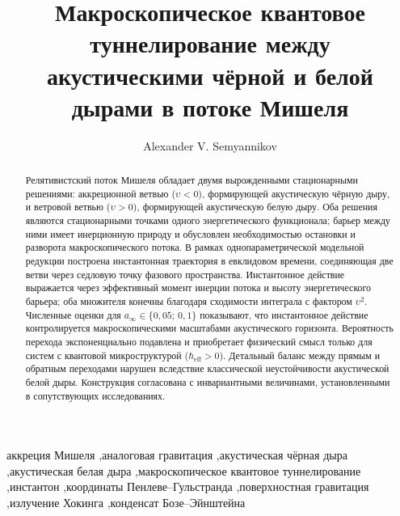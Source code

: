 \documentclass[12pt,a4paper,preprint]{elsarticle}
\begin{document}
    \begin{frontmatter}
        \title{Макроскопическое квантовое туннелирование между\\акустическими чёрной и белой дырами в потоке Мишеля}
        \author{Alexander V. Semyannikov}
        \address{Independent Researcher \\ \textit{Email: avsemyannikov@gmail.com}}
        
        \begin{abstract}
            Релятивистский поток Мишеля обладает двумя вырожденными стационарными решениями: аккреционной ветвью ($\upsilon < 0$), формирующей акустическую чёрную дыру, и ветровой ветвью ($\upsilon > 0$), формирующей акустическую белую дыру. Оба решения являются стационарными точками одного энергетического функционала; барьер между ними имеет инерционную природу и обусловлен необходимостью остановки и разворота макроскопического потока. В рамках однопараметрической модельной редукции построена инстантонная траектория в евклидовом времени, соединяющая две ветви через седловую точку фазового пространства. Инстантонное действие выражается через эффективный момент инерции потока и высоту энергетического барьера; оба множителя конечны благодаря сходимости интеграла с фактором $\upsilon^{2}$. Численные оценки для $a_{\infty} \in \{0{,}05;\, 0{,}1\}$ показывают, что инстантонное действие контролируется макроскопическими масштабами акустического горизонта. Вероятность перехода экспоненциально подавлена и приобретает физический смысл только для систем с квантовой микроструктурой ($\hbar_{\mathrm{eff}} > 0$). Детальный баланс между прямым и обратным переходами нарушен вследствие классической неустойчивости акустической белой дыры. Конструкция согласована с инвариантными величинами, установленными в сопутствующих исследованиях.
        \end{abstract}
        
        \begin{keyword}
            аккреция Мишеля \sep аналоговая гравитация \sep акустическая чёрная дыра \sep акустическая белая дыра \sep макроскопическое квантовое туннелирование \sep инстантон \sep координаты Пенлеве--Гульстранда \sep поверхностная гравитация \sep излучение Хокинга \sep конденсат Бозе--Эйнштейна
        \end{keyword}
    \end{frontmatter}
\end{document}
